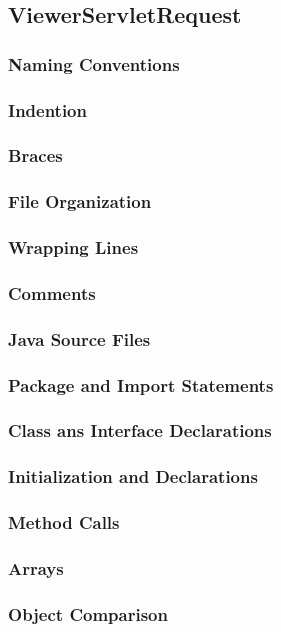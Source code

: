 \documentclass{article}
\begin{document}
\newpage
 \subsection{ViewerServletRequest}
 \subsubsection{Naming Conventions}
 \subsubsection{Indention}
 \subsubsection{Braces}
 \subsubsection{File Organization}
 \subsubsection{Wrapping Lines}
 \subsubsection{Comments}
 \subsubsection{Java Source Files}
 \subsubsection{Package and Import Statements}
 \subsubsection{Class ans Interface Declarations}
 \subsubsection{Initialization and Declarations}
 \subsubsection{Method Calls}
 \subsubsection{Arrays}
 \subsubsection{Object Comparison}
\end{document}
